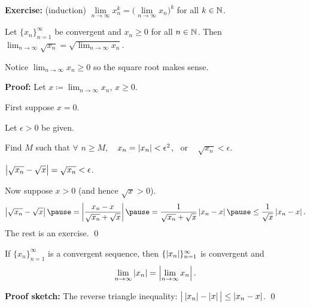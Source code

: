 \documentclass[10pt,aspectratio=149]{beamer}
\begin{document}
\begin{frame}
\textbf{Exercise:} (induction) $\lim\limits_{n\to\infty} x_n^k =
{\bigl(\lim\limits_{n\to\infty} x_n\bigr)}^k$ for all $k \in {\mathbb{N}}$.
\pause

\begin{proposition}
Let $\{ x_n \}_{n=1}^\infty$ be convergent and
$x_n \geq 0$ for all $n \in {\mathbb{N}}$.
Then
$\displaystyle
\lim_{n\to\infty} \sqrt{x_n} =
\sqrt{ \lim_{n\to\infty} x_n }$.
\end{proposition}

\pause
Notice $\displaystyle \lim_{n\to\infty} x_n \geq 0$ so the square root makes sense.

\pause
\textbf{Proof:}
Let $\displaystyle x \coloneqq \lim_{n\to\infty} x_n$,
\pause
\quad   $x \geq 0$.

\pause
\medskip

First suppose $x=0$.

\pause
Let $\epsilon > 0$ be given.

\pause
Find $M$ such that $\forall$ $n \geq M$, ~
$x_n = \left\lvert {x_n} \right\rvert < \epsilon^2$, ~or ~ $\sqrt{x_n} < \epsilon$.

\pause
\thus \quad
$\left\lvert {\sqrt{x_n} - \sqrt{x}} \right\rvert =
\sqrt{x_n} < \epsilon$.

\pause
\medskip

Now suppose $x > 0$ (and hence $\sqrt{x} > 0$).
\pause
\begin{equation*}
\abs{\sqrt{x_n}-\sqrt{x}}
\pause
= 
\abs{\frac{x_n-x}{\sqrt{x_n}+\sqrt{x}}} 
\pause
=
\frac{1}{\sqrt{x_n}+\sqrt{x}}
\abs{x_n-x}
\pause
 \leq
\frac{1}{\sqrt{x}}
\abs{x_n-x} .
\end{equation*}
\pause
The rest is an exercise.
\qed
\end{frame}

\begin{frame}

\begin{proposition}
If $\{ x_n \}_{n=1}^\infty$ is a convergent sequence, then $\{ \left\lvert {x_n} \right\rvert
\}_{n=1}^\infty$
is convergent and
\begin{equation*}
\lim_{n\to\infty} \left\lvert {x_n} \right\rvert = 
\left\lvert {\lim_{n\to\infty} x_n} \right\rvert .
\end{equation*}
\end{proposition}
\pause

\textbf{Proof sketch:}
The reverse triangle inequality: \quad
$\big\lvert \left\lvert {x_n} \right\rvert - \left\lvert {x} \right\rvert \big\rvert \leq \left\lvert {x_n-x} \right\rvert$.
\qed

\end{frame}
\end{document}
